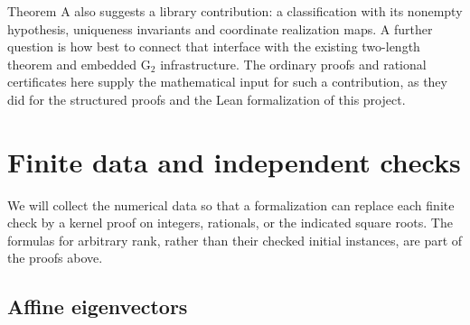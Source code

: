 \documentclass[11pt]{amsart}
\theoremstyle{definition}
\newcommand{\typ}[1]{\mathrm{#1}}
\begin{document}
Theorem A also suggests a library contribution: a classification with
its nonempty hypothesis, uniqueness invariants and coordinate realization
maps. A further question is how best to connect that interface with the
existing two-length theorem and embedded $\typ G_2$ infrastructure.
The ordinary proofs and rational certificates here supply the mathematical
input for such a contribution, as they did for the structured proofs and the
Lean formalization of this project.

\appendix
\section{Finite data and independent checks}\label{sec:data}

We will collect the numerical data so that a formalization can
replace each finite check by a kernel proof on integers, rationals, or
the indicated square roots. The formulas for arbitrary rank, rather than
their checked initial instances, are part of the proofs above.

\subsection{Affine eigenvectors}
\end{document}
